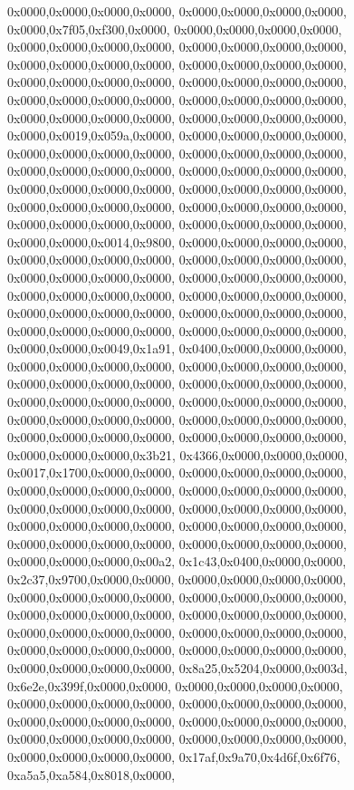 {	0x0000,0x0000,0x0000,0x0000,
	0x0000,0x0000,0x0000,0x0000,
	0x0000,0x7f05,0xf300,0x0000,
	0x0000,0x0000,0x0000,0x0000,
	0x0000,0x0000,0x0000,0x0000,
	0x0000,0x0000,0x0000,0x0000,
	0x0000,0x0000,0x0000,0x0000,
	0x0000,0x0000,0x0000,0x0000,
	0x0000,0x0000,0x0000,0x0000,
	0x0000,0x0000,0x0000,0x0000,
	0x0000,0x0000,0x0000,0x0000,
	0x0000,0x0000,0x0000,0x0000,
	0x0000,0x0000,0x0000,0x0000,
	0x0000,0x0000,0x0000,0x0000,
	0x0000,0x0019,0x059a,0x0000,
	0x0000,0x0000,0x0000,0x0000,
	0x0000,0x0000,0x0000,0x0000,
	0x0000,0x0000,0x0000,0x0000,
	0x0000,0x0000,0x0000,0x0000,
	0x0000,0x0000,0x0000,0x0000,
	0x0000,0x0000,0x0000,0x0000,
	0x0000,0x0000,0x0000,0x0000,
	0x0000,0x0000,0x0000,0x0000,
	0x0000,0x0000,0x0000,0x0000,
	0x0000,0x0000,0x0000,0x0000,
	0x0000,0x0000,0x0000,0x0000,
	0x0000,0x0000,0x0014,0x9800,
	0x0000,0x0000,0x0000,0x0000,
	0x0000,0x0000,0x0000,0x0000,
	0x0000,0x0000,0x0000,0x0000,
	0x0000,0x0000,0x0000,0x0000,
	0x0000,0x0000,0x0000,0x0000,
	0x0000,0x0000,0x0000,0x0000,
	0x0000,0x0000,0x0000,0x0000,
	0x0000,0x0000,0x0000,0x0000,
	0x0000,0x0000,0x0000,0x0000,
	0x0000,0x0000,0x0000,0x0000,
	0x0000,0x0000,0x0000,0x0000,
	0x0000,0x0000,0x0049,0x1a91,
	0x0400,0x0000,0x0000,0x0000,
	0x0000,0x0000,0x0000,0x0000,
	0x0000,0x0000,0x0000,0x0000,
	0x0000,0x0000,0x0000,0x0000,
	0x0000,0x0000,0x0000,0x0000,
	0x0000,0x0000,0x0000,0x0000,
	0x0000,0x0000,0x0000,0x0000,
	0x0000,0x0000,0x0000,0x0000,
	0x0000,0x0000,0x0000,0x0000,
	0x0000,0x0000,0x0000,0x0000,
	0x0000,0x0000,0x0000,0x0000,
	0x0000,0x0000,0x0000,0x3b21,
	0x4366,0x0000,0x0000,0x0000,
	0x0017,0x1700,0x0000,0x0000,
	0x0000,0x0000,0x0000,0x0000,
	0x0000,0x0000,0x0000,0x0000,
	0x0000,0x0000,0x0000,0x0000,
	0x0000,0x0000,0x0000,0x0000,
	0x0000,0x0000,0x0000,0x0000,
	0x0000,0x0000,0x0000,0x0000,
	0x0000,0x0000,0x0000,0x0000,
	0x0000,0x0000,0x0000,0x0000,
	0x0000,0x0000,0x0000,0x0000,
	0x0000,0x0000,0x0000,0x00a2,
	0x1c43,0x0400,0x0000,0x0000,
	0x2c37,0x9700,0x0000,0x0000,
	0x0000,0x0000,0x0000,0x0000,
	0x0000,0x0000,0x0000,0x0000,
	0x0000,0x0000,0x0000,0x0000,
	0x0000,0x0000,0x0000,0x0000,
	0x0000,0x0000,0x0000,0x0000,
	0x0000,0x0000,0x0000,0x0000,
	0x0000,0x0000,0x0000,0x0000,
	0x0000,0x0000,0x0000,0x0000,
	0x0000,0x0000,0x0000,0x0000,
	0x0000,0x0000,0x0000,0x0000,
	0x8a25,0x5204,0x0000,0x003d,
	0x6e2e,0x399f,0x0000,0x0000,
	0x0000,0x0000,0x0000,0x0000,
	0x0000,0x0000,0x0000,0x0000,
	0x0000,0x0000,0x0000,0x0000,
	0x0000,0x0000,0x0000,0x0000,
	0x0000,0x0000,0x0000,0x0000,
	0x0000,0x0000,0x0000,0x0000,
	0x0000,0x0000,0x0000,0x0000,
	0x0000,0x0000,0x0000,0x0000,
	0x17af,0x9a70,0x4d6f,0x6f76,
	0xa5a5,0xa584,0x8018,0x0000,
}
